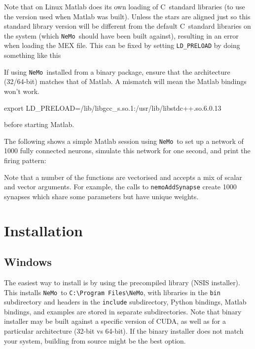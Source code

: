 \documentclass[a4paper]{article}
\newcommand{\nemo}{\texttt{NeMo}}
\newcommand{\code}[1]{\texttt{#1}}
\newcommand{\directory}[1]{\texttt{#1}}
\newcommand{\cpp}{C\nolinebreak\hspace{-.05em}\raisebox{.4ex}{\tiny\bf +}\nolinebreak\hspace{-.10em}\raisebox{.4ex}{\tiny\bf +}}
\begin{document}
Note that on Linux Matlab does its own loading of \cpp\ standard libraries
	(to use the version used when Matlab was built).
Unless the stars are aligned just so this standard library version will be
different from the default \cpp\ standard libraries on the system (which \nemo\ should have been built against), resulting in an error when loading the MEX file.
This can be fixed by setting \code{LD\_PRELOAD} by doing something like this

If using \nemo\ installed from a binary package, ensure that the architecture (32/64-bit) matches that of Matlab.
A mismatch will mean the Matlab bindings won't work.

\begin{shell}
export LD_PRELOAD=/lib/libgcc_s.so.1:/usr/lib/libstdc++.so.6.0.13
\end{shell}

before starting Matlab.

The following shows a simple Matlab session using \nemo\ to set up a network of
1000 fully connected neurons, simulate this network for one second, and print
the firing pattern:



Note that a number of the functions are vectorised and accepts a mix of scalar
and vector arguments. For example, the calls to \code{nemoAddSynapse} create
1000 synapses which share some parameters but have unique weights.

\newpage

\section{Installation}
\label{installation}

\subsection{Windows}
\label{installation:windows}

The easiest way to install is by using the precompiled library (NSIS installer).
This installs \nemo\ to \directory{C:\textbackslash Program Files\textbackslash NeMo},
	with
		libraries in the \directory{bin} subdirectory and
		headers in the \directory{include} subdirectory,
Python bindings, Matlab bindings, and examples are stored in separate subdirectories.
Note that binary installer may be built against a specific version of CUDA, as well as for a particular architecture (32-bit vs 64-bit).
If the binary installer does not match your system, building from source might be the best option. 
\end{document}
